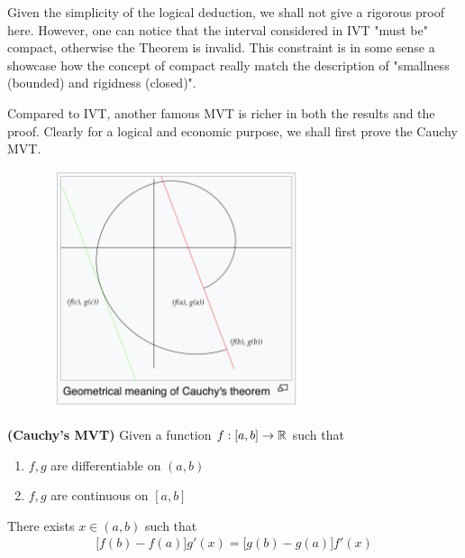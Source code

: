 \documentclass{report}
\begin{document}
\begin{mdframed}
Given the simplicity of the logical deduction, we shall not give a rigorous proof here. However, one can notice that the interval considered in IVT "must be" compact, otherwise the Theorem is invalid. This constraint is in some sense a showcase how the concept of compact really match  the description of "smallness (bounded) and rigidness (closed)". \\
\label{15}

\label{7}
Compared to IVT, another famous MVT is richer in both the results and the proof. Clearly for a logical and economic purpose, we shall first prove the Cauchy MVT.

\includegraphics[height=7cm,width=10cm]{CMVT.png}
\end{mdframed}
\begin{theorem}
\label{CMVT}
\textbf{(Cauchy's MVT)} Given a function $f:[a,b]\to \mathbb{R}$ such that  
\begin{enumerate}[label=(\alph*)]
  \item $f,g$ are  differentiable on $(a,b)$
  \item $f,g$ are continuous on $[a,b]$
\end{enumerate}
There exists $x \in (a,b)$ such that 
 \begin{align*}
   \big[f(b)-f(a) \big]g'(x)=\big[g(b)-g(a) \big]f'(x)
\end{align*}
\end{theorem}
\end{document}
